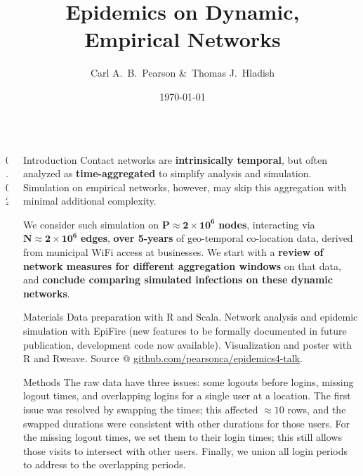 \documentclass[final]{beamer} %
\title[Epi. on Emp. Nets]{Epidemics on Dynamic,\\ Empirical Networks}
\author[Pearson \& Hladish]{Carl A.~B.~Pearson \&\ Thomas J.~Hladish}
\institute[EPI-UF]{Emerging Pathogens Institute, University of Florida}
\date{\today}
\newcommand{\spaceProp}{0.02}
\newcommand{\spacer}{\begin{column}{\spaceProp\paperwidth}\end{column}}
\newenvironment{oneCol}{\begin{column}[t]{0.225\paperwidth}}{\end{column}}
\begin{document}

  \begin{frame}{}
    \begin{columns}[t]
    \spacer{}
    \begin{oneCol}
    \begin{block}{Introduction}
Contact networks are \textbf{intrinsically temporal}, but often analyzed as \textbf{time-aggregated} to simplify analysis and simulation.  Simulation on empirical networks, however, may skip this aggregation with minimal additional complexity.

We consider such simulation on $\mathbf{P\approx 2\times 10^6}$\textbf{ nodes}, interacting via $\mathbf{N\approx 2\times 10^6}$\textbf{ edges}, \textbf{over 5-years} of geo-temporal co-location data, derived from municipal WiFi access at businesses.  We start with a \textbf{review of network measures for different aggregation windows} on that data, and \textbf{conclude comparing simulated infections on these dynamic networks}.
    \end{block}
    \begin{block}{Materials}
Data preparation with R and Scala.  Network analysis and epidemic simulation with EpiFire\cite{hladish2012epifire} (new features to be formally documented in future publication, development code now available).  Visualization and poster with R and Rweave.  Source @ \href{https://github.com/pearsonca/epidemics4-talk}{github.com/pearsonca/epidemics4-talk}.
    \end{block}
    \begin{block}{Methods}
The raw data have three issues: some logouts before logins, missing logout times, and overlapping logins for a single user at a location.  The first issue was resolved by swapping the times; this affected $\approx 10$ rows, and the swapped durations were consistent with other durations for those users.  For the missing logout times, we set them to their login times; this still allows those visits to intersect with other users.  Finally, we union all login periods to address to the overlapping periods.


\end{block}
\end{oneCol}
\end{columns}
\end{frame}
\end{document}

